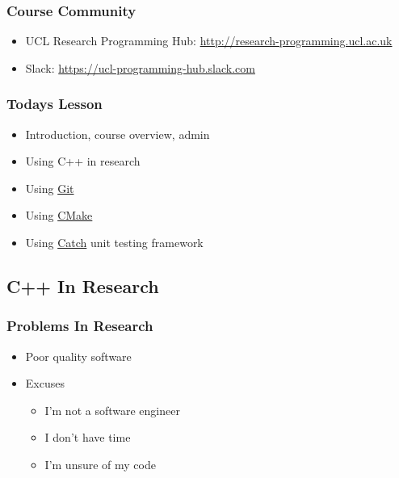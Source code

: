 \subsubsection{Course Community}\label{course-community}

\begin{itemize}
\itemsep1pt\parskip0pt
\item
  UCL Research Programming Hub:
  \href{http://research-programming.ucl.ac.uk/}{http://research-programming.ucl.ac.uk}
\item
  Slack:
  \href{https://ucl-programming-hub.slack.com/}{https://ucl-programming-hub.slack.com}
\end{itemize}

\subsubsection{Todays Lesson}\label{todays-lesson}

\begin{itemize}
\itemsep1pt\parskip0pt
\item
  Introduction, course overview, admin
\item
  Using C++ in research
\item
  Using \href{http://www.git-scm.org}{Git}
\item
  Using \href{http://www.cmake.org}{CMake}
\item
  Using \href{https://github.com/philsquared/Catch}{Catch} unit testing
  framework
\end{itemize}

\subsection{C++ In Research}\label{c-in-research}

\subsubsection{Problems In Research}\label{problems-in-research}

\begin{itemize}
\itemsep1pt\parskip0pt
\item
  Poor quality software
\item
  Excuses

  \begin{itemize}
  \itemsep1pt\parskip0pt
  \item
    I'm not a software engineer
  \item
    I don't have time
  \item
    I'm unsure of my code
  \end{itemize}
\end{itemize}

